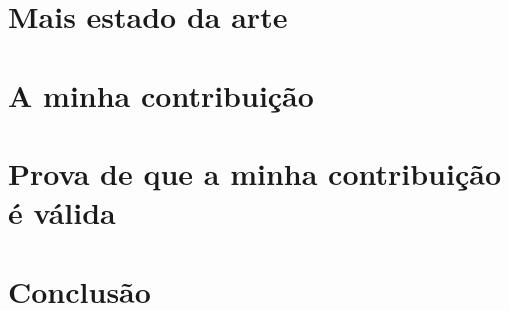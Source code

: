 \documentclass[cic,tc]{iiufrgs}
\begin{document}
\chapter{Mais estado da arte}

\chapter{A minha contribuição}

\chapter{Prova de que a minha contribuição é válida}

\chapter{Conclusão}




\end{document}

